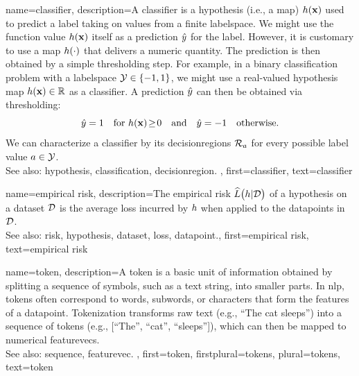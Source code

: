 {name={classifier},
	description={A classifier is a \gls{hypothesis} (i.e., a \gls{map}) $h({\bf x})$ 
		used to predict a \gls{label} taking on values from a finite \gls{labelspace}. We might use the 
		\gls{function} value $h({\bf x})$ itself as a \gls{prediction} $\hat{y}$ for 
		the \gls{label}. However, it is customary to use a \gls{map} $h(\cdot)$ that delivers 
		a numeric quantity. The \gls{prediction} is then obtained by a simple thresholding step. 
		For example, in a binary \gls{classification} problem with a \gls{labelspace} $\mathcal{Y} \in  \{ -1,1\}$, 
		we might use a real-valued \gls{hypothesis} \gls{map} $h({\bf x}) \in \mathbb{R}$ 
		as a classifier. A \gls{prediction} $\hat{y}$ can then be obtained via thresholding:
		 \begin{equation} 
		 	\label{equ_def_threshold_bin_classifier_dict}
		 	\hat{y} =1 \quad  \mbox{for } h({\bf x})\!\geq\!0 \quad \mbox{and} \quad	\hat{y} =-1  \quad \mbox{otherwise.}
	 	\end{equation}
 		We can characterize a classifier by its \glspl{decisionregion} $\mathcal{R}_{a}$ for 
 		every possible \gls{label} value $a \in \mathcal{Y}$.
					\\ 
		See also: \gls{hypothesis}, \gls{classification}, \gls{decisionregion}. },
	first={classifier},
	text={classifier} 
}

{name={empirical risk},
	description={The empirical \gls{risk} $\widehat{L}\big(h|\mathcal{D}\big)$ 
  		of a \gls{hypothesis} on a \gls{dataset} $\mathcal{D}$ is the average \gls{loss} incurred 
  		by $h$ when applied to the \glspl{datapoint} in $\mathcal{D}$.
				\\ 
		See also: \gls{risk}, \gls{hypothesis}, \gls{dataset}, \gls{loss}, \gls{datapoint}.},
  	first={empirical risk},
  	text={empirical risk} 
}

{name={token},
	description={A token is a basic unit of information 
  		obtained by splitting a \gls{sequence} of symbols, such as a text string, 
  		into smaller parts. In \gls{nlp}, tokens often correspond to words, subwords, 
  		or characters that form the \glspl{feature} of a \gls{datapoint}. 
  		Tokenization transforms raw text (e.g., ``The cat sleeps'') into a 
  		\gls{sequence} of tokens (e.g., [``The'', ``cat'', ``sleeps'']), which can
  		then be mapped to numerical \glspl{featurevec}.
		\\
		See also: \gls{sequence}, \gls{featurevec}. }, 
  	first={token}, 
  	firstplural={tokens}, 
  	plural={tokens}, 
  	text={token}
}

